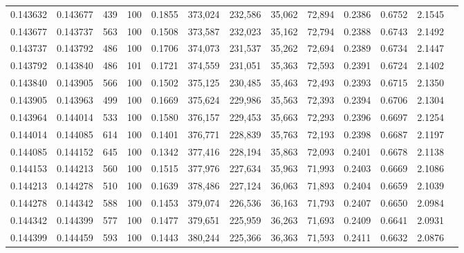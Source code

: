 \begin{tabular}{rrrrrrrrrrrrr}
0.143632 & 0.143677 &   439 & 100 &                                     0.1855 & 373,024 & 232,586 &  35,062 &  72,894 & 0.2386 & 0.6752 & 2.1545 \\
0.143677 & 0.143737 &   563 & 100 &                                     0.1508 & 373,587 & 232,023 &  35,162 &  72,794 & 0.2388 & 0.6743 & 2.1492 \\
0.143737 & 0.143792 &   486 & 100 &                                     0.1706 & 374,073 & 231,537 &  35,262 &  72,694 & 0.2389 & 0.6734 & 2.1447 \\
0.143792 & 0.143840 &   486 & 101 &                                     0.1721 & 374,559 & 231,051 &  35,363 &  72,593 & 0.2391 & 0.6724 & 2.1402 \\
0.143840 & 0.143905 &   566 & 100 &                                     0.1502 & 375,125 & 230,485 &  35,463 &  72,493 & 0.2393 & 0.6715 & 2.1350 \\
0.143905 & 0.143963 &   499 & 100 &                                     0.1669 & 375,624 & 229,986 &  35,563 &  72,393 & 0.2394 & 0.6706 & 2.1304 \\
0.143964 & 0.144014 &   533 & 100 &                                     0.1580 & 376,157 & 229,453 &  35,663 &  72,293 & 0.2396 & 0.6697 & 2.1254 \\
0.144014 & 0.144085 &   614 & 100 &                                     0.1401 & 376,771 & 228,839 &  35,763 &  72,193 & 0.2398 & 0.6687 & 2.1197 \\
0.144085 & 0.144152 &   645 & 100 &                                     0.1342 & 377,416 & 228,194 &  35,863 &  72,093 & 0.2401 & 0.6678 & 2.1138 \\
0.144153 & 0.144213 &   560 & 100 &                                     0.1515 & 377,976 & 227,634 &  35,963 &  71,993 & 0.2403 & 0.6669 & 2.1086 \\
0.144213 & 0.144278 &   510 & 100 &                                     0.1639 & 378,486 & 227,124 &  36,063 &  71,893 & 0.2404 & 0.6659 & 2.1039 \\
0.144278 & 0.144342 &   588 & 100 &                                     0.1453 & 379,074 & 226,536 &  36,163 &  71,793 & 0.2407 & 0.6650 & 2.0984 \\
0.144342 & 0.144399 &   577 & 100 &                                     0.1477 & 379,651 & 225,959 &  36,263 &  71,693 & 0.2409 & 0.6641 & 2.0931 \\
0.144399 & 0.144459 &   593 & 100 &                                     0.1443 & 380,244 & 225,366 &  36,363 &  71,593 & 0.2411 & 0.6632 & 2.0876 \\

\end{tabular}
